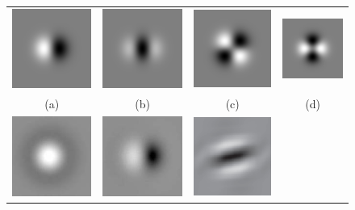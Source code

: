 \documentclass{IEEEtran}
\begin{document}
\begin{figure}[t]
\centering
\begin{tabular}{@{}c c c c@{}} %
\includegraphics[width=0.2\columnwidth]{figs/filtering/Gx} &
\includegraphics[width=0.2\columnwidth]{figs/filtering/Gxx} &
\includegraphics[width=0.2\columnwidth]{figs/filtering/Gxy} &
\includegraphics[width=0.2\columnwidth]{figs/filtering/Gxx-Gyy} \\
(a) & (b) & (c) & (d) \\
\noalign{\smallskip}
%
\includegraphics[width=0.2\columnwidth]{figs/filtering/mono_b} &
\includegraphics[width=0.2\columnwidth]{figs/filtering/mono_hx} &
\includegraphics[width=0.2\columnwidth]{figs/filtering/dt_cwt_r4} &

\end{tabular}
\end{figure}
\end{document}
